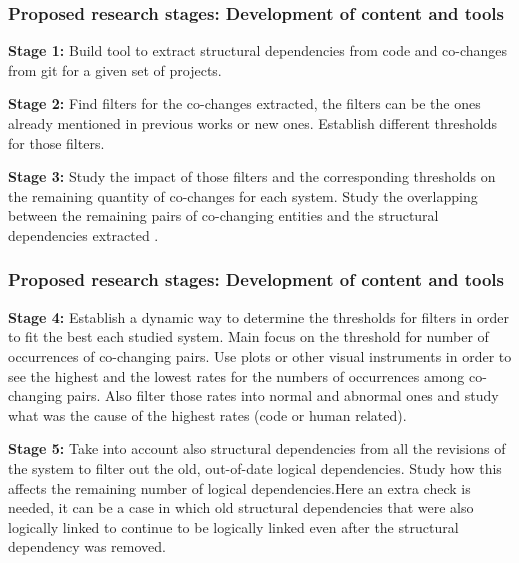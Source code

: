 \documentclass{beamer}
\begin{document}

 \begin{frame}
\frametitle{Proposed research stages: Development of content and tools }

\textbf{Stage 1:} Build tool to extract structural dependencies from code and co-changes from git for a given set of projects.

\textbf{Stage 2:} Find filters for the co-changes extracted, the filters can be the ones already mentioned in previous works or new ones. Establish different thresholds for those filters.

\textbf{Stage 3:} Study the impact of those filters and the corresponding thresholds on the remaining quantity of co-changes for each system.
Study the overlapping between the remaining pairs of co-changing entities and the structural dependencies extracted \cite{enase19}. 



\end{frame}


 \begin{frame}
\frametitle{Proposed research stages: Development of content and tools }

\textbf{Stage 4:} Establish a dynamic way to determine the thresholds for filters in order to fit the best each studied system. Main focus on the threshold for number of occurrences of co-changing pairs.
Use plots or other visual instruments in order to see the highest and the lowest rates for the numbers of occurrences among co-changing pairs.
Also filter those rates into normal and abnormal ones and study what was the cause of the highest rates (code or human related).

\textbf{Stage 5:} Take into account also structural dependencies from all the revisions of the system to filter out the old, out-of-date logical dependencies. 
Study how this affects the remaining number of logical dependencies.Here an extra check is needed, it can be a case in which old structural dependencies that were also logically linked to continue to be logically linked
even after the structural dependency was removed.

\end{frame}

\end{document}

